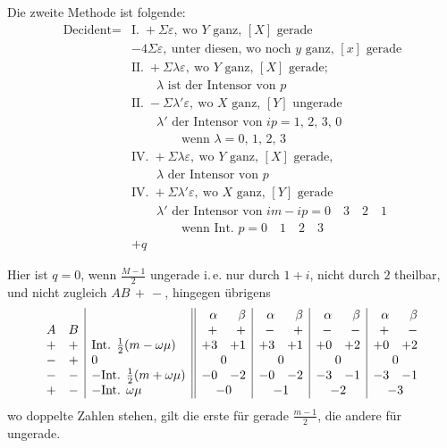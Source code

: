 %
Die zweite Methode ist folgende:
\[
\begin{aligned}
\text{Decident}={}&\text{I.}\;+\Sigma\varepsilon,\ \text{wo }Y\text{ ganz, }[X]\text{ gerade}\\
&-4\Sigma\varepsilon,\ \text{unter diesen, wo noch }y\text{ ganz, }[x]\text{ gerade}\\
&\text{II.}\;+\Sigma\lambda\varepsilon,\ \text{wo }Y\text{ ganz, }[X]\text{ gerade;}\\
&\qquad\lambda\text{ ist der Intensor von }p\\
&\text{II.}\;-\Sigma\lambda'\varepsilon,\ \text{wo }X\text{ ganz, }[Y]\text{ ungerade}\\
&\qquad\lambda'\text{ der Intensor von }ip=1,\,2,\,3,\,0\\
&\qquad\qquad\text{wenn }\lambda=0,\,1,\,2,\,3\\
&\text{IV.}\;+\Sigma\lambda\varepsilon,\ \text{wo }Y\text{ ganz, }[X]\text{ gerade,}\\
&\qquad\lambda\text{ der Intensor von }p\\
&\text{IV.}\;+\Sigma\lambda'\varepsilon,\ \text{wo }X\text{ ganz, }[Y]\text{ gerade}\\
&\qquad\lambda'\text{ der Intensor von }im-ip=0\quad3\quad2\quad1\\
&\qquad\qquad\text{wenn Int. }p=0\quad1\quad2\quad3\\
&+q
\end{aligned}
\]

Hier ist $q=0$, wenn $\frac{M-1}{2}$ ungerade i.\,e. nur durch $1+i$, nicht durch $2$ theilbar, und nicht zugleich $AB\,+\,-$, hingegen übrigens
\begingroup\small\setlength{\arraycolsep}{2pt}
\[
\begin{array}{cc|l||rr|rr|rr|rr}
&&&\alpha&\beta&\alpha&\beta&\alpha&\beta&\alpha&\beta\\
A&B&&+&+&-&+&-&-&+&-\\
+&+&\text{Int. }\frac12(m-\omega\mu)&+3&+1&+3&+1&+0&+2&+0&+2\\
-&+&0&\multicolumn{2}{c|}{0}&\multicolumn{2}{c|}{0}&\multicolumn{2}{c|}{0}&\multicolumn{2}{c}{0}\\
-&-&-\text{Int. }\frac12(m+\omega\mu)&-0&-2&-0&-2&-3&-1&-3&-1\\
+&-&-\text{Int. }\omega\mu&\multicolumn{2}{c|}{-0}&\multicolumn{2}{c|}{-1}&\multicolumn{2}{c|}{-2}&\multicolumn{2}{c}{-3}
\end{array}
\]
\endgroup
wo doppelte Zahlen stehen, gilt die erste für gerade $\frac{m-1}{2}$, die andere für ungerade.

